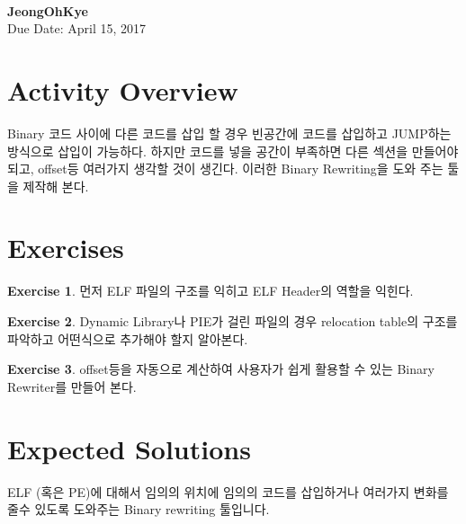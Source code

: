 \documentclass[a4paper, 11pt]{article}
\theoremstyle{definition}
\newtheorem{exercise}{Exercise}
\begin{document}
 \\
         {\phantom{} \hfill \textbf{JeongOhKye}} \\
         {\phantom{} \hfill Due Date: April 15, 2017} \\

\section{Activity Overview}

Binary 코드 사이에 다른 코드를 삽입 할 경우 빈공간에 코드를 삽입하고 JUMP하는 방식으로 삽입이 가능하다. 하지만 코드를 넣을 공간이 부족하면 다른 섹션을 만들어야 되고, offset등 여러가지 생각할 것이 생긴다. 이러한 Binary Rewriting을 도와 주는 툴을 제작해 본다.

\section{Exercises}

\begin{exercise}

  먼저 ELF 파일의 구조를 익히고 ELF Header의 역할을 익힌다.

\end{exercise}

\begin{exercise}

  Dynamic Library나 PIE가 걸린 파일의 경우 relocation table의 구조를 파악하고 어떤식으로 추가해야 할지 알아본다.

\end{exercise}

\begin{exercise}

  offset등을 자동으로 계산하여 사용자가 쉽게 활용할 수 있는 Binary Rewriter를 만들어 본다.

\end{exercise}

\section{Expected Solutions}

ELF (혹은 PE)에 대해서 임의의 위치에 임의의 코드를 삽입하거나 여러가지 변화를 줄수 있도록 도와주는 Binary rewriting 툴입니다. 



\end{document}
